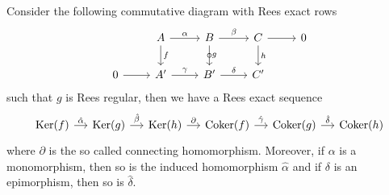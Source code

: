 \begin{lemma}
    Consider the following commutative diagram with Rees exact rows
    \[\begin{tikzcd}
        & A & B & C & 0 \\
        0 & {A'} & {B'} & {C'}
        \arrow["\alpha", from=1-2, to=1-3]
        \arrow["f", from=1-2, to=2-2]
        \arrow["\beta", from=1-3, to=1-4]
        \arrow["g", "\circ"{marking}, from=1-3, to=2-3]
        \arrow[from=1-4, to=1-5]
        \arrow["h", from=1-4, to=2-4]
        \arrow[from=2-1, to=2-2]
        \arrow["\gamma", from=2-2, to=2-3]
        \arrow["\delta", from=2-3, to=2-4]
    \end{tikzcd}\]
    such that $g$ is Rees regular, then we have a Rees exact sequence
    \[\begin{tikzcd}[sep=small]
        {\Kernel{f}} & {\Kernel{g}} & {\Kernel{h}} & {\Cokernel{f}} & {\Cokernel{g}} & {\Cokernel{h}}
        \arrow["{\hat{\alpha}}", from=1-1, to=1-2]
        \arrow["{\hat{\beta}}", from=1-2, to=1-3]
        \arrow["\partial", from=1-3, to=1-4]
        \arrow["{\hat{\gamma}}", from=1-4, to=1-5]
        \arrow["{\hat{\delta}}", from=1-5, to=1-6]
    \end{tikzcd}\]
    where $\partial$ is the so called connecting homomorphism. Moreover, if $\alpha$ is a monomorphism, then so is the induced 
    homomorphism $\hat{\alpha}$ and if $\delta$ is an epimorphism, then so is $\hat{\delta}$.
\end{lemma}
